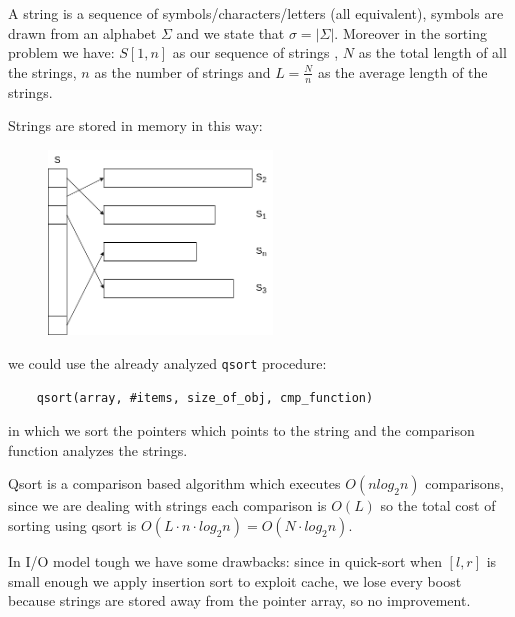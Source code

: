 A string is a sequence of symbols/characters/letters (all equivalent), symbols are drawn from an alphabet $\Sigma$ and we state that $\sigma = |\Sigma|$.
Moreover in the sorting problem we have: $S[1, n]$ as our sequence of strings , $N$ as the total length of all the strings, $n$ as the number of strings and $L = \frac{N}{n}$ as the average length of the strings.

Strings are stored in memory in this way:
\begin{figure}[H]
    \centering
    \includegraphics[width=225px]{images/5_String_sorting/string_storage.png}
\end{figure}
we could use the already analyzed \verb|qsort| procedure:
\begin{verbatim}
    qsort(array, #items, size_of_obj, cmp_function)
\end{verbatim}
in which we sort the pointers which points to the string and the comparison function analyzes the strings.

Qsort is a comparison based algorithm which executes $O(nlog_2 n)$ comparisons, since we are dealing with strings each comparison is $O(L)$ so the total cost of sorting using qsort is $O(L \cdot n \cdot log_2 n) = O(N \cdot log_2 n)$.

In I/O model tough we have some drawbacks: since in quick-sort when $[l,r]$ is small enough we apply insertion sort to exploit cache, we lose every boost because strings are stored away from the pointer array, so no improvement.

